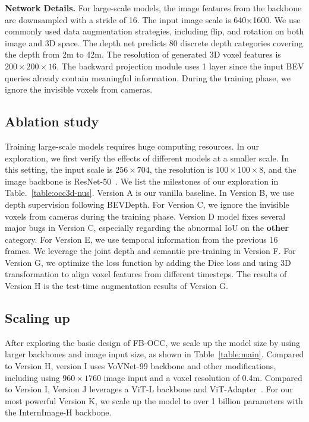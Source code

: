 \documentclass[10pt,twocolumn,letterpaper]{article}
\begin{document}
\vspace{2mm}
\noindent\textbf{Network Details.} For large-scale models, the image features from the backbone are downsampled with a stride of 16. The input image scale is 640$\times$1600. We use commonly used data augmentation strategies, including flip, and rotation on both image and 3D space. The depth net predicts 80 discrete depth categories covering the depth from 2m to 42m. The resolution of generated 3D voxel features is $200\times200\times16$. The backward projection module uses 1 layer since the input BEV queries already contain meaningful information. During the training phase, we ignore the invisible voxels from cameras.


\subsection{Ablation study}

Training large-scale models requires huge computing resources. In our exploration, we first verify the effects of different models at a smaller scale. In this setting, the input scale is $256\times 704$, the resolution is $100\times100\times8$, and the image backbone is ResNet-50~\cite{he2016deep}. We list the milestones of our exploration in Table.~\ref{table:occ3d-nus}.
Version A is our vanilla baseline. In Version B, we use depth supervision following BEVDepth. For Version C, we ignore the invisible voxels from cameras during the training phase. Version D model fixes several major bugs in Version C, especially regarding the abnormal IoU on the \textbf{other} category. For Version E, we use temporal information from the previous 16 frames. We leverage the joint depth and semantic pre-training in Version F. For Version G, we optimize the loss function by adding the Dice loss and using 3D transformation to align voxel features from different timesteps. The results of Version H is the test-time augmentation results of Version G.

\subsection{Scaling up}
After exploring the basic design of FB-OCC, we scale up the model size by using larger backbones and image input size, as shown in Table~\ref{table:main}. Compared to Version H, version I uses VoVNet-99 backbone and other modifications, including using $960\times1760$ image input and a voxel resolution of 0.4m. Compared to Version I, Version J leverages a ViT-L backbone and ViT-Adapter~\cite{chen2023vision}. For our most powerful Version K, we scale up the model to over 1 billion parameters with the InternImage-H backbone.
\end{document}

